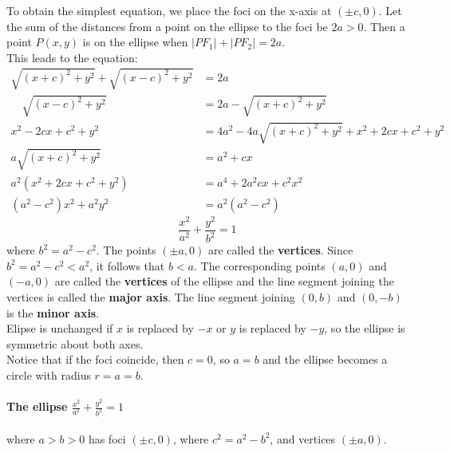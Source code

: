 \documentclass{article}
\begin{document}
To obtain the simplest equation, we place the foci on the x-axis at $(\pm c, 0)$. Let the sum of the distances from a point on the ellipse to the foci be $2a > 0$. Then a point $P(x,y)$ is on the ellipse when $|PF_1| + |PF_2| = 2a$. 
\\This leads to the equation:
    \begin{align*}
    \sqrt{(x+c)^2 + y^2} + \sqrt{(x-c)^2 + y^2} &= 2a \\
    \quad \sqrt{(x-c)^2 + y^2} &= 2a - \sqrt{(x+c)^2 + y^2} \\
    x^2 - 2cx + c^2 + y^2 &= 4a^2 - 4a\sqrt{(x+c)^2 + y^2} + x^2 + 2cx + c^2 + y^2 \\
    a\sqrt{(x+c)^2 + y^2} &= a^2 + cx \\
    a^2(x^2 + 2cx + c^2 + y^2) &= a^4 + 2a^2cx + c^2x^2 \\
    (a^2 - c^2)x^2 + a^2y^2 &= a^2(a^2 - c^2)
    \end{align*}
\[
\frac{x^2}{a^2} + \frac{y^2}{b^2} = 1
\]
where $b^2 = a^2 - c^2$. The points $(\pm a,0)$ are called the \textbf{vertices}.
Since $b^2 = a^2 - c^2 < a^2$, it follows that $b < a$. The corresponding points $(a,0)$ and $(-a,0)$ are called the \textbf{vertices} of the ellipse and the line segment joining the vertices is called the \textbf{major axis}. The line segment joining $(0,b)$ and $(0,-b)$ is the \textbf{minor axis}. 
\\Elipse is unchanged if $x$ is replaced by $-x$ or $y$ is replaced by $-y$, so the ellipse is symmetric about both axes. 
\\Notice that if the foci coincide, then $c=0$, so $a=b$ and the ellipse becomes a circle with radius $r=a=b$.
\paragraph{The ellipse $\frac{x^2}{a^2} + \frac{y^2}{b^2} = 1$} where $a > b > 0$ has foci $(\pm c, 0)$, where $c^2 = a^2 - b^2$, and vertices $(\pm a, 0)$.
\end{document}
